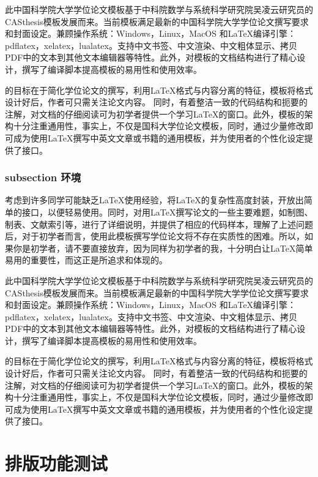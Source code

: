 \documentclass[
  fontset = mac,
]{shtthesis}
\begin{document}
此中国科学院大学学位论文模板\shtthesis 基于中科院数学与系统科学研究院吴凌云研究员的CASthesis模板发展而来。当前\shtthesis 模板满足最新的中国科学院大学学位论文撰写要求和封面设定。兼顾操作系统：Windows，Linux，MacOS 和\LaTeX{}编译引擎：pdflatex，xelatex，lualatex。支持中文书签、中文渲染、中文粗体显示、拷贝PDF中的文本到其他文本编辑器等特性。此外，对模板的文档结构进行了精心设计，撰写了编译脚本提高模板的易用性和使用效率。

\shtthesis 的目标在于简化学位论文的撰写，利用\LaTeX{}格式与内容分离的特征，模板将格式设计好后，作者可只需关注论文内容。 同时，\shtthesis 有着整洁一致的代码结构和扼要的注解，对文档的仔细阅读可为初学者提供一个学习\LaTeX{}的窗口。此外，模板的架构十分注重通用性，事实上，\shtthesis 不仅是国科大学位论文模板，同时，通过少量修改即可成为使用\LaTeX{}撰写中英文文章或书籍的通用模板，并为使用者的个性化设定提供了接口。

\subsection{\ShtThesis subsection 环境}
考虑到许多同学可能缺乏\LaTeX{}使用经验，\shtthesis 将\LaTeX{}的复杂性高度封装，开放出简单的接口，以便轻易使用。同时，对用\LaTeX{}撰写论文的一些主要难题，如制图、制表、文献索引等，进行了详细说明，并提供了相应的代码样本，理解了上述问题后，对于初学者而言，使用此模板撰写学位论文将不存在实质性的困难。所以，如果你是初学者，请不要直接放弃，因为同样为初学者的我，十分明白让\LaTeX{}简单易用的重要性，而这正是\shtthesis 所追求和体现的。

此中国科学院大学学位论文模板\shtthesis 基于中科院数学与系统科学研究院吴凌云研究员的CASthesis模板发展而来。当前\shtthesis 模板满足最新的中国科学院大学学位论文撰写要求和封面设定。兼顾操作系统：Windows，Linux，MacOS 和\LaTeX{}编译引擎：pdflatex，xelatex，lualatex。支持中文书签、中文渲染、中文粗体显示、拷贝PDF中的文本到其他文本编辑器等特性。此外，对模板的文档结构进行了精心设计，撰写了编译脚本提高模板的易用性和使用效率。

\shtthesis 的目标在于简化学位论文的撰写，利用\LaTeX{}格式与内容分离的特征，模板将格式设计好后，作者可只需关注论文内容。 同时，\shtthesis 有着整洁一致的代码结构和扼要的注解，对文档的仔细阅读可为初学者提供一个学习\LaTeX{}的窗口。此外，模板的架构十分注重通用性，事实上，\shtthesis 不仅是国科大学位论文模板，同时，通过少量修改即可成为使用\LaTeX{}撰写中英文文章或书籍的通用模板，并为使用者的个性化设定提供了接口。

\chapter{排版功能测试}
\end{document}
